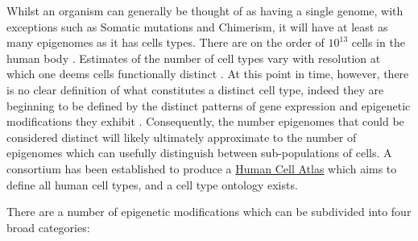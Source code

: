 \documentclass[
]{book}
\begin{document}
Whilst an organism can generally be thought of as having a single genome, with exceptions such as Somatic mutations and Chimerism, it will have at least as many epigenomes as it has cells types. There are on the order of \(10^{13}\) cells in the human body \citep{Bianconi2013}. Estimates of the number of cell types vary with resolution at which one deems cells functionally distinct \citep{HumanCellAtlas}. At this point in time, however, there is no clear definition of what constitutes a distinct cell type, indeed they are beginning to be defined by the distinct patterns of gene expression and epigenetic modifications they exhibit \citep{CellSystemsCellType2017}. Consequently, the number epigenomes that could be considered distinct will likely ultimately approximate to the number of epigenomes which can usefully distinguish between sub-populations of cells. A consortium has been established to produce a \href{www.humancellatlas.org}{Human Cell Atlas} \citep{Regev2017} which aims to define all human cell types, and a cell type ontology \citep{CellOntologyOBO} exists.

There are a number of epigenetic modifications which can be subdivided into four broad categories:
\end{document}
